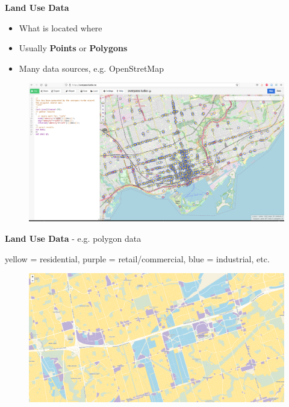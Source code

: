 \documentclass[aspectratio=169]{beamer}
\begin{document}
\begin{frame}
	
	\textbf{Land Use Data}
	
	\begin{itemize}
		\item What is located where
		\item Usually \textbf{Points} or \textbf{Polygons}
		\item Many data sources, e.g. OpenStretMap
	\end{itemize}

	\begin{figure}
		\centering
		\includegraphics[width=0.9\linewidth]{images/cafe_osm_tor.png}
	\end{figure}
	
	
\end{frame}



\begin{frame}
	
	\textbf{Land Use Data} - e.g. polygon data

	yellow = residential, purple = retail/commercial, blue = industrial, etc. 
	
	\begin{figure}
		\centering
		\includegraphics[width=0.9\linewidth]{images/land-use-scarboro.png}
	\end{figure}
	
\end{frame}
\end{document}
